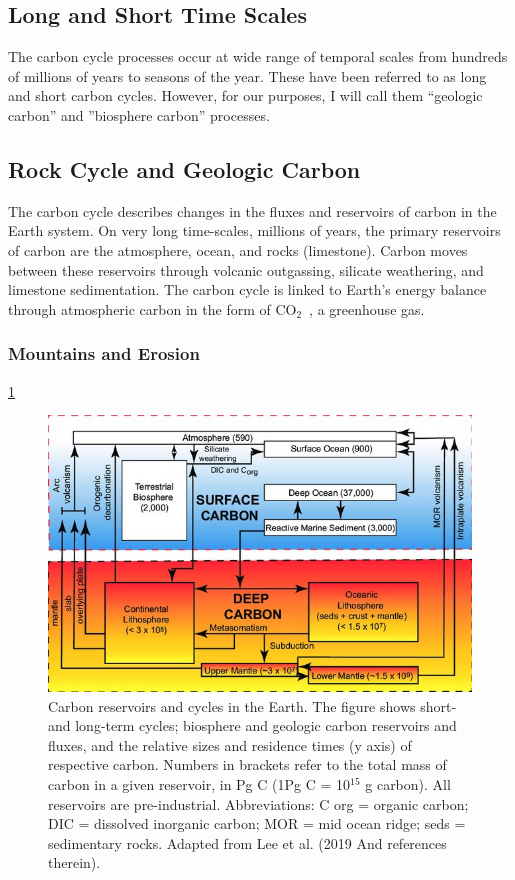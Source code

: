 \documentclass{book}\usepackage{knitr}
\newcommand{\carbondioxide}{CO$_2$~}
\begin{document}
\begin{knitrout}
\begin{kframe}
\subsection{Long and Short Time Scales}

The carbon cycle processes occur at wide range of temporal scales from hundreds of millions of years to seasons of the year. These have been referred to as long and short carbon cycles. However, for our purposes, I will call them ``geologic carbon'' and ''biosphere carbon'' processes. 

\subsection{Rock Cycle and Geologic Carbon}

The carbon cycle describes changes in the fluxes and reservoirs of carbon in the Earth system. On very long time-scales, millions of years, the primary reservoirs of carbon are the atmosphere, ocean, and rocks (limestone). Carbon moves between these reservoirs through volcanic outgassing, silicate weathering, and limestone sedimentation. The carbon cycle is linked to Earth's energy balance through atmospheric carbon in the form of \carbondioxide, a greenhouse gas.

\subsubsection{Mountains and Erosion}

\ref{fig:carbonpools}

\begin{figure}
\includegraphics[width=\linewidth]{images/earth-system/Carbon-reservoirs-and-cycles-in-the-Earth.jpg}
\caption{Carbon reservoirs and cycles in the Earth. The figure shows short-and long-term cycles; biosphere and geologic carbon reservoirs and fluxes, and the relative sizes and residence times (y axis) of respective carbon. Numbers in brackets refer to the total mass of carbon in a given reservoir, in Pg C (1Pg C = 10$^{15}$ g carbon). All reservoirs are pre-industrial. Abbreviations: C org = organic carbon; DIC = dissolved inorganic carbon; MOR = mid ocean ridge; seds = sedimentary rocks. Adapted from Lee et al. (2019 And references therein).}
\label{fig:carbonpools}
\end{figure}


\end{kframe}
\end{knitrout}
\end{document}
